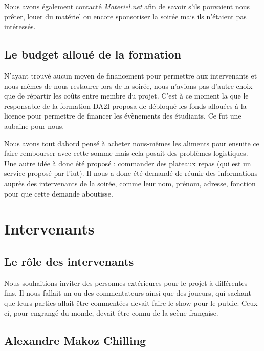 Nous avons également contacté \emph{Materiel.net} afin de savoir s'ils pouvaient nous prêter,
louer du matériel ou encore sponsoriser la soirée mais ils n'étaient pas intéressés.

\subsection{Le budget alloué de la formation}%
\label{sub:le_budget_allou_de_la_formation}

N'ayant trouvé aucun moyen de financement pour permettre aux
intervenants et nous-mêmes de nous restaurer lors de la soirée, nous
n'avions pas d'autre choix que de répartir les coûts entre membre du
projet. C'est à ce moment la que le responsable de la formation DA2I
proposa de débloqué les fonds allouées à la licence pour permettre de
financer les évènements des étudiants. Ce fut une aubaine pour nous.

Nous avons tout dabord pensé à acheter nous-mêmes les aliments pour
ensuite ce faire rembourser avec cette somme mais cela posait des
problèmes logistiques. Une autre idée à donc été proposé : commander des
plateaux repas (qui est un service proposé par l'iut). Il nous a donc
été demandé de réunir des informations auprès des intervenants de la
soirée, comme leur nom, prénom, adresse, fonction pour que cette demande
aboutisse.


\section{Intervenants}%
\label{sec:intervenants}

\subsection{Le rôle des intervenants}%
\label{sub:le_role_des_intervenants}

Nous souhaitions inviter des personnes extérieures pour le projet à
différentes fins. Il nous fallait un ou des commentateurs ainsi que des
joueurs, qui sachant que leurs parties allait être commentées devait faire
le show pour le public. Ceux-ci, pour engrangé du monde, devait être
connu de la scène française.

\subsection{Alexandre \og Makoz \fg{} Chilling}%
\label{sub:alexandre_makoz_chilling}

